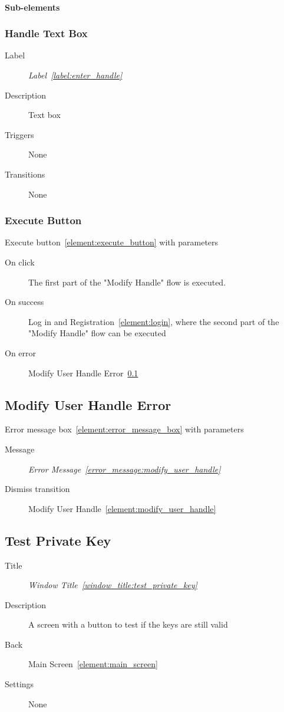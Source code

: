 \documentclass[a4paper,10pt]{article}
\newcommand{\windowTitleLabelText}{Window Title}
\newcommand{\windowTitleLabel}{window_title:}
\DeclareRobustCommand{\windowTitleRef}[1]{%
   \emph{\windowTitleLabelText~\ref{\windowTitleLabel#1}}}
\newcommand{\errorMessageLabelText}{Error Message}
\newcommand{\errorMessageLabel}{error_message:}
\DeclareRobustCommand{\errorMessageTextRef}[1]{%
   \emph{\errorMessageLabelText~\ref{\errorMessageLabel#1}}}
\newcommand{\labelLabelText}{Label}
\newcommand{\labelLabel}{label:}
\DeclareRobustCommand{\labelRef}[1]{%
   \emph{\labelLabelText~\ref{\labelLabel#1}}}
\newcommand{\elementLabel}{element:}
\DeclareRobustCommand{\element}[2]{\subsection{#1}\label{\elementLabel#2}}
\DeclareRobustCommand{\elementRef}[1]{\ref{\elementLabel#1}}
\begin{document}
\paragraph{Sub-elements}

\subsubsection{Handle Text Box}
\begin{description}
 \item[Label] \labelRef{enter_handle}
 \item[Description] Text box
 \item[Triggers] None
 \item[Transitions] None
\end{description}

\subsubsection{Execute Button}
Execute button~\elementRef{execute_button} with parameters
\begin{description}
 \item[On click] The first part of the "Modify Handle" flow is executed.
 \item[On success] Log in and Registration~\elementRef{login}, where the second 
part of the "Modify Handle" flow can be executed
 \item[On error] Modify User Handle Error~\elementRef{modify_user_handle_error}
\end{description}

\element{Modify User Handle Error}{modify_user_handle_error}

Error message box~\elementRef{error_message_box} with parameters
\begin{description}
 \item[Message] \errorMessageTextRef{modify_user_handle}
 \item[Dismiss transition] Modify User 
Handle~\elementRef{modify_user_handle}
\end{description}

\element{Test Private Key}{test_private_key}

\begin{description}
 \item[Title] \windowTitleRef{test_private_key}
 \item[Description] A screen with a button to test if the keys are still valid
 \item[Back] Main Screen~\elementRef{main_screen}
 \item[Settings] None
\end{description}
\end{document}
